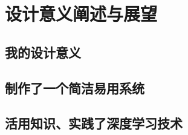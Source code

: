 
\chapter{设计意义阐述与展望}

\section{我的设计意义}

\section{制作了一个简洁易用系统}

\section{活用知识、实践了深度学习技术}

\section{}





